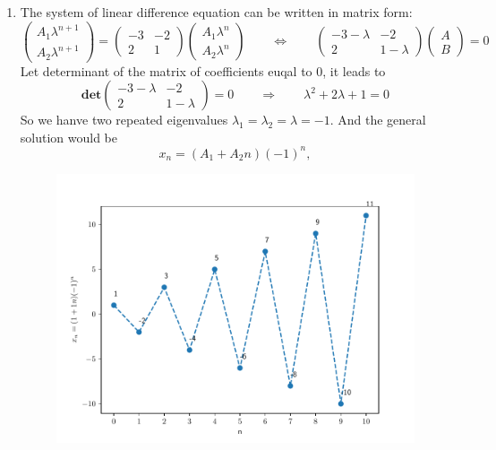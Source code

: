 \begin{homeworkProblem}
\begin{enumerate}
\begin{enumerate}[label=(\roman*)]
            \item The system of linear difference equation can be written in matrix form: \[
                \left(\begin{matrix}A_1\lambda^{n+1}\\ A_2\lambda^{n+1}\end{matrix}\right)
                = \left(\begin{matrix}
                    -3 & -2 \\
                     2 &  1
                \end{matrix}\right)
                \left(\begin{matrix}A_1\lambda^n \\ A_2 \lambda^n \end{matrix}\right)
            \qquad \Leftrightarrow \qquad
                \left(\begin{matrix}
                    -3-\lambda & -2 \\
                     2 &  1-\lambda
                \end{matrix}\right) \left(\begin{matrix}A\\B\end{matrix}\right)
                = 0
            \]
            Let determinant of the matrix of coefficients euqal to $0$, it leads to \[
                \mathbf{det}\left(\begin{matrix}
                    -3-\lambda & -2 \\
                     2 &  1-\lambda
                \end{matrix}\right) = 0 \qquad \Rightarrow \qquad
                \lambda^2 + 2\lambda + 1 = 0
            \]
            So we hanve two repeated eigenvalues $\lambda_1 = \lambda_2 = \lambda = -1$. And the
            general solution would be \[
                x_n = (A_1 + A_2 n) (-1)^n,
            \]
            \begin{figure}[H]
                \centering
                \includegraphics[scale=0.5]{fig/fig3(b)(iii).pdf}

\end{figure}
\end{enumerate}
\end{enumerate}
\end{homeworkProblem}
